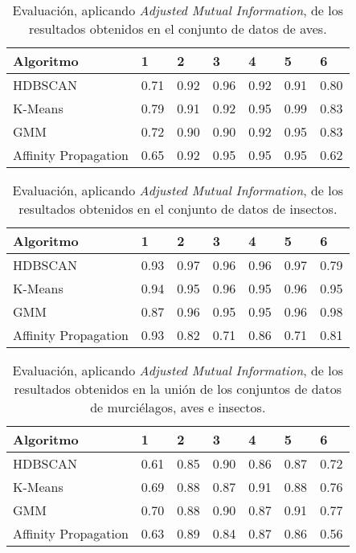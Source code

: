\begin{table}[H]
    \centering
    \begin{tabular}{lllllll}
        \hline
        Algoritmo & 1 & 2 & 3 & 4 & 5 & 6  \\ \hline
        HDBSCAN & 0.71 & 0.92 & 0.96 & 0.92 & 0.91 & 0.80 \\
        K-Means & 0.79 & 0.91 & 0.92 & 0.95 & \cellcolor[HTML]{FFFC9E}0.99 & 0.83 \\
        GMM & 0.72 & 0.90 & 0.90 & 0.92 & 0.95 & 0.83 \\
        Affinity Propagation & 0.65 & 0.92 & 0.95 & 0.95 & 0.95 & 0.62
    \end{tabular}
    \caption{Evaluación, aplicando \textit{Adjusted Mutual Information}, de los resultados obtenidos en el conjunto de datos de aves.}
    \label{table:birds-ami}
\end{table}

\begin{table}[H]
    \centering
    \begin{tabular}{lllllll}
        \hline
        Algoritmo & 1 & 2 & 3 & 4 & 5 & 6  \\ \hline
        HDBSCAN & 0.93 & 0.97 & 0.96 & 0.96 & 0.97 & 0.79 \\
        K-Means & 0.94 & 0.95 & 0.96 & 0.95 & 0.96 & 0.95 \\
        GMM & 0.87 & 0.96 & 0.95 & 0.95 & 0.96 & \cellcolor[HTML]{FFFC9E}0.98 \\
        Affinity Propagation & 0.93 & 0.82 & 0.71 & 0.86 & 0.71 & 0.81
    \end{tabular}
    \caption{Evaluación, aplicando \textit{Adjusted Mutual Information}, de los resultados obtenidos en el conjunto de datos de insectos.}
    \label{table:insects-ami}
\end{table}

\begin{table}[H]
    \centering
    \begin{tabular}{lllllll}
        \hline
        Algoritmo & 1 & 2 & 3 & 4 & 5 & 6  \\ \hline
        HDBSCAN & 0.61 & 0.85 & 0.90 & 0.86 & 0.87 & 0.72 \\
        K-Means & 0.69 & 0.88 & 0.87 & \cellcolor[HTML]{FFFC9E}0.91 & 0.88 & 0.76 \\
        GMM & 0.70 & 0.88 & 0.90 & 0.87 & \cellcolor[HTML]{FFFC9E}0.91 & 0.77 \\
        Affinity Propagation & 0.63 & 0.89 & 0.84 & 0.87 & 0.86 & 0.56
    \end{tabular}
    \caption{Evaluación, aplicando \textit{Adjusted Mutual Information}, de los resultados obtenidos en la unión de los conjuntos de datos de murciélagos, aves e insectos.}
    \label{table:all-ami}
\end{table}

